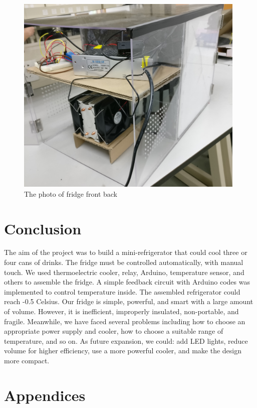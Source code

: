 \documentclass[12pt,onecolumn]{article}
\begin{document}
\begin{figure}[H]
	\centering
	\includegraphics[width=11cm]{fridge2}
	\caption{The photo of fridge front back}
\end{figure}



\section{Conclusion}
The aim of the project was to build a mini-refrigerator that could cool three or four cans of drinks. The fridge must be controlled automatically, with manual touch. We used thermoelectric cooler, relay, Arduino, temperature sensor, and others to assemble the fridge. A simple feedback circuit with Arduino codes was implemented to control temperature inside. The assembled refrigerator could reach -0.5 Celsius. Our fridge is simple, powerful, and smart with a large amount of volume. However, it is inefficient, improperly insulated, non-portable, and fragile. Meanwhile, we have faced several problems including how to choose an appropriate power supply and cooler, how to choose a suitable range of temperature, and so on. As future expansion, we could: add LED lights, reduce volume for higher efficiency, use a more powerful cooler, and make the design more compact.

\newpage
\section{Appendices}

\end{document}
